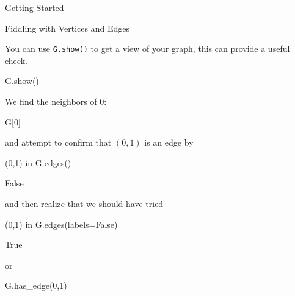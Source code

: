 \begin{chap}{Getting Started}
\begin{sect}{Fiddling with Vertices and Edges}
\begin{sagecode}
\begin{sageoutput}
\end{sageoutput}
\end{sagecode}
%
\begin{para}
You can use \verb|G.show()| to get a view of your graph, this can provide
a useful check.
\end{para}
%
%
\begin{sagecode}
\begin{sageinput}
G.show()
\end{sageinput}
\begin{sageoutput}
\end{sageoutput}
\end{sagecode}
%
\begin{para}
We find the neighbors of 0:
\end{para}
%
\begin{sagecode}
\begin{sageinput}
G[0]
\end{sageinput}
\begin{sageoutput}
[8, 1, 2, 7]
\end{sageoutput}
\end{sagecode}
%
\begin{para}    
and attempt to confirm that $(0,1)$ is an edge by
\end{para}
%
\begin{sagecode}
\begin{sageinput}
(0,1) in G.edges()
\end{sageinput}
\begin{sageoutput}
False
\end{sageoutput}
\end{sagecode}
%
\begin{para}
and then realize that we should have tried
\end{para}
%
%
\begin{sagecode}
\begin{sageinput}
(0,1) in G.edges(labels=False)
\end{sageinput}
\begin{sageoutput}
True
\end{sageoutput}
\end{sagecode}
%
\begin{para}
or
\end{para}
%
\begin{sagecode}
\begin{sageinput}
G.has_edge(0,1)
\end{sageinput}
\begin{sageoutput}

\end{sageoutput}
\end{sagecode}
\end{sect}
\end{chap}

